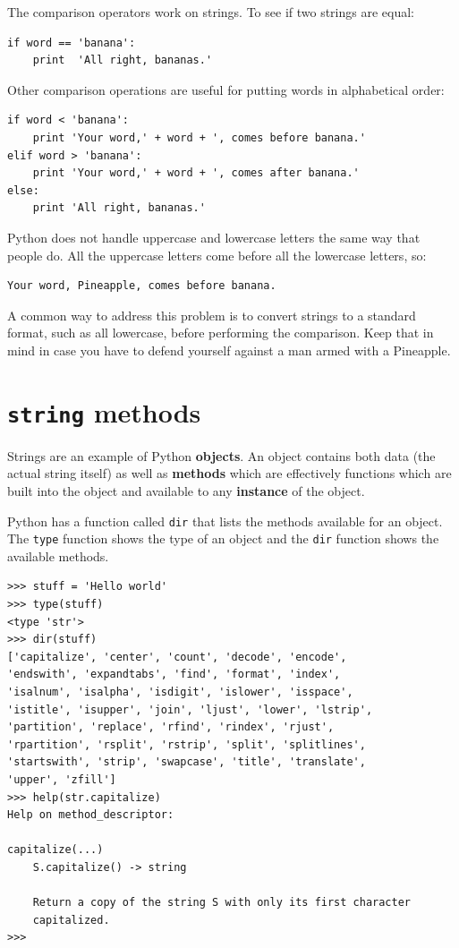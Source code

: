 \documentclass[10pt]{book}
\begin{document}
The comparison operators work on strings.  To see if two strings are equal:

\beforeverb
\begin{verbatim}
if word == 'banana':
    print  'All right, bananas.'
\end{verbatim}
\afterverb
%
Other comparison operations are useful for putting words in alphabetical
order:

\beforeverb
\begin{verbatim}
if word < 'banana':
    print 'Your word,' + word + ', comes before banana.'
elif word > 'banana':
    print 'Your word,' + word + ', comes after banana.'
else:
    print 'All right, bananas.'
\end{verbatim}
\afterverb
%
Python does not handle uppercase and lowercase letters the same way
that people do.  All the uppercase letters come before all the
lowercase letters, so:

\beforeverb
\begin{verbatim}
Your word, Pineapple, comes before banana.
\end{verbatim}
\afterverb
%
A common way to address this problem is to convert strings to a
standard format, such as all lowercase, before performing the
comparison.  Keep that in mind in case you have to defend yourself
against a man armed with a Pineapple.


\section{{\tt string} methods}

Strings are an example of Python {\bf objects}.  An object contains
both data (the actual string itself) as well as {\bf methods} which
are effectively functions which are built into the object and 
available to any {\bf instance} of the object.

Python has a function called {\tt dir} that lists the methods available
for an object.  The {\tt type} function shows the type of an object 
and the {\tt dir} function shows the available methods.
\beforeverb
\begin{verbatim}
>>> stuff = 'Hello world'
>>> type(stuff)
<type 'str'>
>>> dir(stuff)
['capitalize', 'center', 'count', 'decode', 'encode', 
'endswith', 'expandtabs', 'find', 'format', 'index', 
'isalnum', 'isalpha', 'isdigit', 'islower', 'isspace', 
'istitle', 'isupper', 'join', 'ljust', 'lower', 'lstrip', 
'partition', 'replace', 'rfind', 'rindex', 'rjust', 
'rpartition', 'rsplit', 'rstrip', 'split', 'splitlines', 
'startswith', 'strip', 'swapcase', 'title', 'translate', 
'upper', 'zfill']
>>> help(str.capitalize)
Help on method_descriptor:

capitalize(...)
    S.capitalize() -> string
    
    Return a copy of the string S with only its first character
    capitalized.
>>>
\end{verbatim}
\afterverb
%
\end{document}
